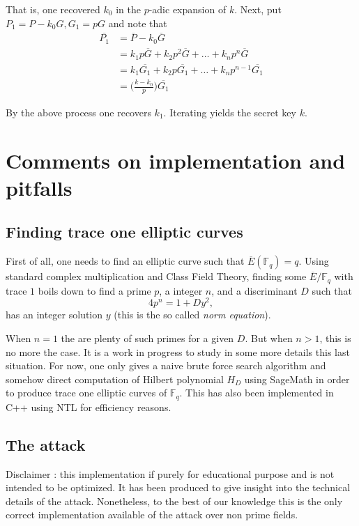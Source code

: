 \documentclass[10pt]{article}
\theoremstyle{definition}
\newcommand{\F}{\mathbb{F}}
\begin{document}
That is, one recovered $k_0$ in the $p$-adic expansion of $k$.	
Next, put $P_1 = P - k_0G, G_1 = pG$ and note that
\begin{align*}
\overline{P_1} &=  \overline{P} - k_0 \overline{G}  \\
               &=  k_1p\overline{G} + k_2p^2\overline{G} + \dots + k_np^n \overline{G}\\
               &=  k_1\overline{G_1} + k_2p\overline{G_1} + \dots + k_np^{n-1} \overline{G_1}\\
               &= \Big(\frac{k-k_0}{p}\Big)\overline{G_1}
\end{align*}

By the above process one recovers $k_1$.
Iterating yields the secret key $k$.


\section{Comments on implementation and pitfalls}


\subsection{Finding trace one elliptic curves}


First of all, one needs to find an elliptic curve such that $\overline{E}(\F_q) = q$.
Using standard complex multiplication and Class Field Theory, finding some $\overline{E} /\F_q$ with trace $1$ boils down to find a prime $p$, a integer $n$,  and a discriminant $D$ such that 
\[ 4p^n = 1 + Dy^2, \]
has an integer solution $y$ (this is the so called \textsl{norm equation}).

When $n =1$ the are plenty of such primes for a given $D$.
But when $n > 1$, this is no more the case. 
It is a work in progress to study in some more details this last situation.
For now, one only gives a naive brute force search algorithm and somehow direct computation of Hilbert polynomial $H_D$ using SageMath in order to produce trace one elliptic curves of $\F_q$.
This has also been implemented in C++ using NTL for efficiency reasons.
\subsection{The attack}

Disclaimer : this implementation if purely for educational purpose and is not intended to be optimized. 
It has been produced  to give insight into the technical details of the attack.
Nonetheless, to the best of our knowledge this is the only correct implementation available of the attack over non prime fields.
\end{document}
